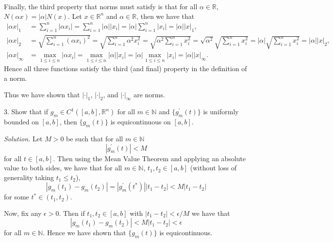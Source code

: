 \documentclass{article}
\newcommand{\N}{\mathbb{N}}
\newcommand{\R}{\mathbb{R}}
\begin{document}
Finally, the third property that norms must satisfy is that for all $\alpha \in \R$,
$N(\alpha x) = |\alpha| N(x)$. Let $x \in \R^n$ and $\alpha \in \R$, then we have that
%
\begin{align*}
    |\alpha x|_1
        &= \sum_{i = 1}^n |\alpha x_i|
        = \sum_{i = 1}^n |\alpha| |x_i|
        = |\alpha| \sum_{i = 1}^n |x_i|
        = |\alpha| |x|_1
        , \\
    |\alpha x|_2
        &= \sqrt{\sum_{i = 1}^n (\alpha x_i)^2}
        = \sqrt{\sum_{i = 1}^n \alpha^2 x_i^2}
        = \sqrt{\alpha^2 \sum_{i = 1}^n x_i^2}
        = \sqrt{\alpha^2} \sqrt{\sum_{i = 1}^n x_i^2}
        = |\alpha| \sqrt{\sum_{i = 1}^n x_i^2}
        = |\alpha| |x|_2
        , \\
    |\alpha x|_\infty
        &= \max_{1 \leq i \leq n} |\alpha x_i|
        = \max_{1 \leq i \leq n} |\alpha| |x_i|
        = |\alpha| \max_{1 \leq i \leq n} |x_i|
        = |\alpha| |x|_\infty
        .
\end{align*}
%
Hence all three functions satisfy the third (and final) property in the definition of a norm.

Thus we have shown that $|\cdot|_1$, $|\cdot|_2$, and $|\cdot|_\infty$ are norms.

\newpage

3. Show that if $g_m \in C^1([a, b], \R^n)$ for all $m \in \N$ and $\{g_m^\prime(t)\}$
is uniformly bounded on $[a, b]$, then $\{g_m(t)\}$ is equicontinuous on $[a, b]$.

\textit{Solution.}
Let $M > 0$ be such that for all $m \in \N$
%
\begin{equation*}
    |g_m^\prime(t)| < M
\end{equation*}
%
for all $t \in [a, b]$. Then using the Mean Value Theorem and applying
an absolute value to both sides, we have that
for all $m \in \N$, $t_1, t_2 \in [a, b]$
(without loss of generality taking $t_1 \leq t_2$),
%
\begin{equation*}
    |g_m(t_1) - g_m(t_2)| = |g_m^\prime(t^*)| |t_1 - t_2| < M |t_1 - t_2|
\end{equation*}
%
for some $t^* \in (t_1, t_2)$.

Now, fix any $\epsilon > 0$. Then if $t_1, t_2 \in [a, b]$ with
$|t_1 - t_2| < \epsilon / M$ we have that
%
\begin{equation*}
    |g_m(t_1) - g_m(t_2)| < M |t_1 - t_2| < \epsilon
\end{equation*}
%
for all $m \in \N$. Hence we have shown that $\{g_m(t)\}$ is equicontinuous.
\end{document}
